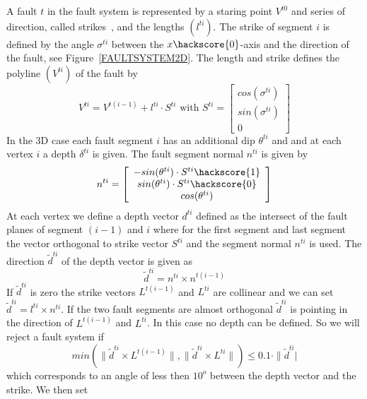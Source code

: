 A fault $t$ in the fault system is represented by a staring point $V^{t0}$ and series of
direction, called strikes~, and the lengths $(l^{ti})$. 
The strike of segment $i$ is defined by the angle $\sigma^{ti}$ between the $x\hackscore{0}$-axis and the 
direction of the fault, see Figure~\ref{FAULTSYSTEM2D}. The length and strike defines the  
polyline $(V^{ti})$ of the fault by
\begin{equation}
V^{ti} = V^{t(i-1)} + 
l^{ti} \cdot  S^{ti}
\mbox{ with }
S^{ti} =
\left[
\begin{array}{c}
 cos(\sigma^{ti})  \\
 sin(\sigma^{ti}) \\
 0 
\end{array}
\right]
\label{eq:fault 00}
\end{equation}
In the 3D case each fault segment $i$ has an additional dip  $\theta^{ti}$ and
and at each vertex $i$ a depth $\delta^{ti}$ is given. The fault segment normal $n^{ti}$ is given by
\begin{equation}
n^{ti} = 
\left[
\begin{array}{c}
 -sin(\theta^{ti}) \cdot S^{ti}\hackscore{1} \\
 sin(\theta^{ti}) \cdot S^{ti}\hackscore{0} \\
 cos(\theta^{ti}) 
\end{array}
\right]
\label{eq:fault 0}
\end{equation}
At each vertex we define a depth vector $d^{ti}$ defined as the
intersect of the fault planes of segment $(i-1)$ and $i$ where 
for the first segment and last segment the vector orthogonal to strike vector $S^{ti}$
and the segment normal $n^{ti}$ is used. The direction $\tilde{d}^{ti}$ of the depth vector is 
given as 
\begin{equation}
\tilde{d}^{ti} = n^{ti} \times n^{t(i-1)}
\label{eq:fault b}
\end{equation}
If $\tilde{d}^{ti}$ is zero the strike vectors $L^{t(i-1)}$ and $L^{ti}$ are collinear and
we can set $\tilde{d}^{ti} = l^{ti} \times n^{ti}$. If the two fault segments are almost 
orthogonal $\tilde{d}^{ti}$ is pointing in the direction of $L^{t(i-1)}$ and $L^{ti}$. In this case no 
depth can be defined. So we will reject a fault system if 
\begin{equation}
min(\| \tilde{d}^{ti}  \times  L^{t(i-1)} \|,\| \tilde{d}^{ti}  \times  L^{ti} \|) 
\le 0.1 \cdot \| \tilde{d}^{ti} | 
\label{eq:fault c}
\end{equation}
which corresponds to an angle of less then $10^o$ between the depth vector and the strike. We then set
